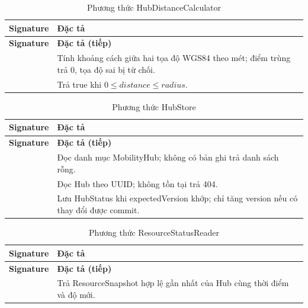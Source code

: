 
\begin{longtable}{|L{58mm}|L{81mm}|}
\caption{Phương thức HubDistanceCalculator}\\\hline
\textbf{Signature} & \textbf{Đặc tả}\\\hline
\endfirsthead
\hline\textbf{Signature} & \textbf{Đặc tả (tiếp)}\\\hline\endhead
{} & Tính khoảng cách giữa hai tọa độ WGS84 theo mét; điểm trùng trả 0, tọa độ sai bị từ chối.\\\hline
{} & Trả true khi $0\leq distance\leq radius$.\\\hline
\end{longtable}


\begin{longtable}{|L{58mm}|L{81mm}|}
\caption{Phương thức HubStore}\\\hline
\textbf{Signature} & \textbf{Đặc tả}\\\hline
\endfirsthead
\hline\textbf{Signature} & \textbf{Đặc tả (tiếp)}\\\hline\endhead
{} & Đọc danh mục MobilityHub; không có bản ghi trả danh sách rỗng.\\\hline
{} & Đọc Hub theo UUID; không tồn tại trả 404.\\\hline
{} & Lưu HubStatus khi expectedVersion khớp; chỉ tăng version nếu có thay đổi được commit.\\\hline
\end{longtable}


\begin{longtable}{|L{58mm}|L{81mm}|}
\caption{Phương thức ResourceStatusReader}\\\hline
\textbf{Signature} & \textbf{Đặc tả}\\\hline
\endfirsthead
\hline\textbf{Signature} & \textbf{Đặc tả (tiếp)}\\\hline\endhead
{} & Trả ResourceSnapshot hợp lệ gần nhất của Hub cùng thời điểm và độ mới.\\\hline
\end{longtable}


